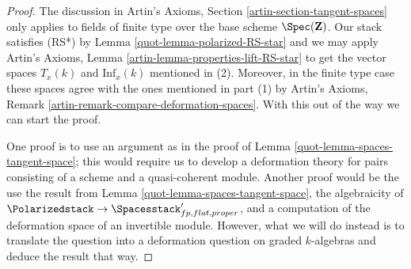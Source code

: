 \begin{proof}

The discussion in Artin's Axioms, Section \ref{artin-section-tangent-spaces}
only applies to fields of finite type over the base scheme $\Spec(\mathbf{Z})$.
Our stack satisfies (RS*) by Lemma \ref{quot-lemma-polarized-RS-star}
and we may apply
Artin's Axioms, Lemma \ref{artin-lemma-properties-lift-RS-star}
to get the vector spaces $T_x(k)$ and $\text{Inf}_x(k)$
mentioned in (2). Moreover, in the finite type case these spaces agree with the
ones mentioned in part (1)
by Artin's Axioms, Remark \ref{artin-remark-compare-deformation-spaces}.
With this out of the way we can start the proof.

\medskip\noindent
One proof is to use an argument as in the proof of
Lemma \ref{quot-lemma-spaces-tangent-space}; this would
require us to develop a deformation theory for pairs
consisting of a scheme and a quasi-coherent module.
Another proof would be the use the result from
Lemma \ref{quot-lemma-spaces-tangent-space},
the algebraicity of
$\Polarizedstack \to \Spacesstack'_{fp, flat, proper}$,
and a computation of the deformation space of an
invertible module. However, what we will do instead
is to translate the question into a deformation question
on graded $k$-algebras and deduce the result that way.


\end{proof}
